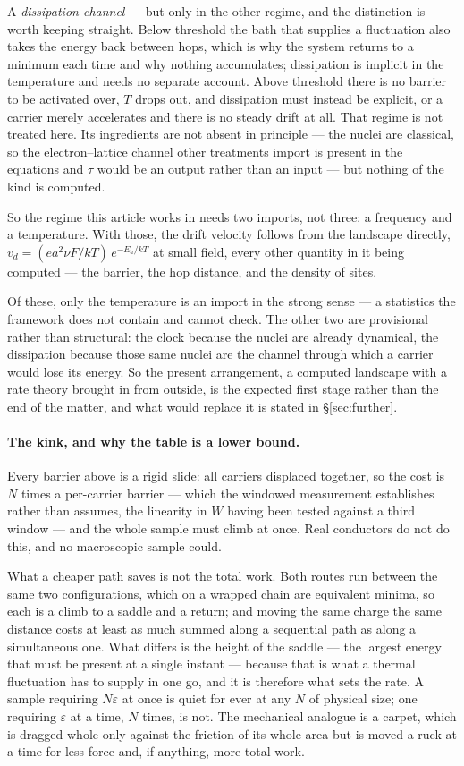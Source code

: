 \documentclass[11pt]{article}
\begin{document}
A \emph{dissipation channel} --- but only in the other regime, and the distinction is worth keeping
straight. Below threshold the bath that supplies a fluctuation also takes the energy back between
hops, which is why the system returns to a minimum each time and why nothing accumulates; dissipation
is implicit in the temperature and needs no separate account. Above threshold there is no barrier to
be activated over, $T$ drops out, and dissipation must instead be explicit, or a carrier merely
accelerates and there is no steady drift at all. That regime is not treated here. Its ingredients are
not absent in principle --- the nuclei are classical, so the electron--lattice channel other
treatments import is present in the equations and $\tau$ would be an output rather than an input ---
but nothing of the kind is computed.

So the regime this article works in needs two imports, not three: a frequency and a temperature.
With those, the drift velocity follows from the landscape directly,
$v_d = (ea^2\nu F/kT)\,e^{-E_a/kT}$ at small field, every other quantity in it being computed ---
the barrier, the hop distance, and the density of sites.

Of these, only the temperature is an import in the strong sense --- a statistics the framework
does not contain and cannot check. The other two are provisional rather than structural: the clock
because the nuclei are already dynamical, the dissipation because those same nuclei are the channel
through which a carrier would lose its energy. So the present arrangement, a computed landscape with
a rate theory brought in from outside, is the expected first stage rather than the end of the matter,
and what would replace it is stated in \S\ref{sec:further}.

\paragraph{The kink, and why the table is a lower bound.} Every barrier above is a rigid slide: all
carriers displaced together, so the cost is $N$ times a per-carrier barrier --- which the windowed
measurement establishes rather than assumes, the linearity in $W$ having been tested against a third
window --- and the whole sample must climb at once. Real conductors do not do this, and no
macroscopic sample could.

What a cheaper path saves is not the total work. Both routes run between the same two
configurations, which on a wrapped chain are equivalent minima, so each is a climb to a saddle and
a return; and moving the same charge the same distance costs at least as much summed along a
sequential path as along a simultaneous one. What differs is the height of the saddle --- the
largest energy that must be present at a single instant --- because that is what a thermal
fluctuation has to supply in one go, and it is therefore what sets the rate. A sample requiring
$N\varepsilon$ at once is quiet for ever at any $N$ of physical size; one requiring $\varepsilon$ at
a time, $N$ times, is not. The mechanical analogue is a carpet, which is dragged whole only against
the friction of its whole area but is moved a ruck at a time for less force and, if anything, more
total work.
\end{document}
